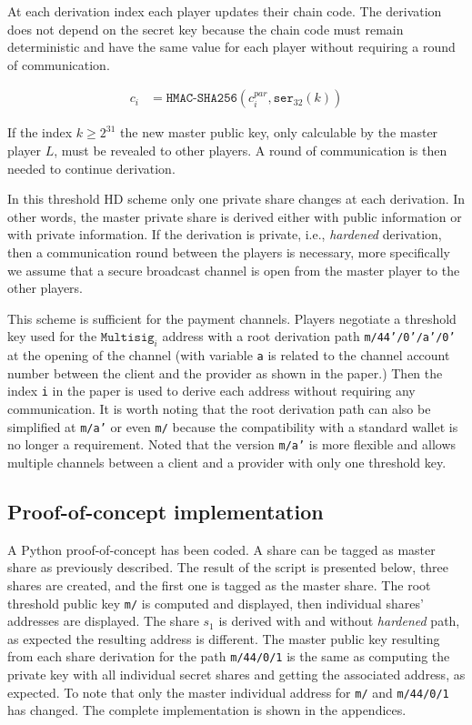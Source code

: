 At each derivation index each player updates their chain code. The derivation
does not depend on the secret key because the chain code must remain
deterministic and have the same value for each player without requiring
a round of communication.

\begin{equation}
\begin{split}
  c_i &= \texttt{HMAC-SHA256}(c_i^{par}, \texttt{ser}_{32}(k))
\end{split}
\end{equation}

If the index $k \geq 2^{31}$ the new master public key, only calculable by the
master player $L$, must be revealed to other players. A round of communication
is then needed to continue derivation.

In this threshold HD scheme only one private share changes at each derivation. In
other words, the master private share is derived either with public information
or with private information. If the derivation is private, i.e.,
\textit{hardened} derivation, then a communication round between the players is
necessary, more specifically we assume that a secure broadcast channel is open
from the master player to the other players.

This scheme is sufficient for the payment channels. Players negotiate a
threshold key used for the $\texttt{Multisig}_i$ address with a root derivation
path \texttt{m/44'/0'/a'/0'} at the opening of the channel (with variable \texttt{a}
is related to the channel account number between the client and the provider as
shown in the paper.) Then the index \texttt{i} in the paper is used to derive
each address without requiring any communication. It is worth noting that the
root derivation path can also be simplified at \texttt{m/a'} or even \texttt{m/}
because the compatibility with a standard wallet is no longer a requirement.
Noted that the version \texttt{m/a'} is more flexible and allows multiple
channels between a client and a provider with only one threshold key.

\subsection{Proof-of-concept implementation}

A Python proof-of-concept has been coded. A share can be tagged as
master share as previously described. The result of the script is presented
below, three shares are created, and the first one is tagged as the master
share. The root threshold public key \texttt{m/} is computed and displayed, then
individual shares' addresses are displayed. The share $s_1$ is derived with and
without \textit{hardened} path, as expected the resulting address is different.
The master public key resulting from each share derivation for the path
\texttt{m/44/0/1} is the same as computing the private key with all individual
secret shares and getting the associated address, as expected. To note that only
the master individual address for \texttt{m/} and \texttt{m/44/0/1} has changed.
The complete implementation is shown in the appendices.

